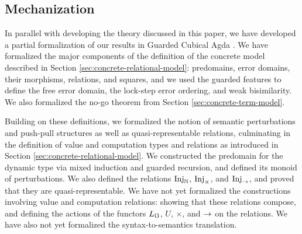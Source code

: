 
\subsection{Mechanization}
In parallel with developing the theory discussed in this paper, we have
developed a partial formalization of our results in Guarded Cubical Agda
\cite{veltri-vezzosi2020}.
%
We have formalized the major components of the definition of the concrete model
described in Section \ref{sec:concrete-relational-model}: predomains, error
domains, their morphisms, relations, and squares, and we used the guarded
features to define the free error domain, the lock-step error ordering, and weak
bisimilarity. We also formalized the no-go theorem from Section
\ref{sec:concrete-term-model}.

Building on these definitions, we formalized the notion of semantic
perturbations and push-pull structures as well as quasi-representable relations,
culminating in the definition of value and computation types and relations as
introduced in Section \ref{sec:concrete-relational-model}.
%
%
We constructed the predomain for the dynamic type via mixed induction and
guarded recursion, and defined its monoid of perturbations. We also defined the
relations $\text{Inj}_\mathbb{N}$, $\text{Inj}_\times$, and $\text{Inj}_\to$, and proved that they are
quasi-representable.
%
We have not yet formalized the constructions involving value and computation
relations: showing that these relations compose, and defining the actions of the
functors $L_\mho$, $U$, $\times$, and $\to$ on the relations. We have also not yet
formalized the syntax-to-semantics translation.



